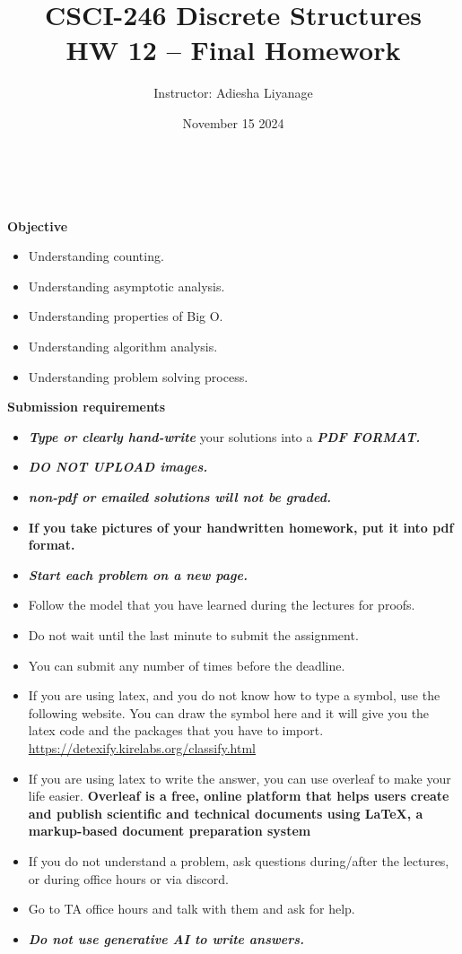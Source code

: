 \documentclass[12pt]{exam}
\title{CSCI-246 Discrete Structures \\ HW 12 -- Final Homework}
\author{Instructor: Adiesha Liyanage}
\date{November 15 2024}
\begin{document}
\maketitle

\hrulefill
\\
\\
\textbf{Objective}
\begin{itemize}
    \item Understanding counting.
    \item Understanding asymptotic analysis.
    \item Understanding properties of Big O.
    \item Understanding algorithm analysis.
    \item Understanding problem solving process. 
\end{itemize}

\textbf{Submission requirements}
\begin{itemize}
    \item \textbf{\textit{Type or clearly hand-write}} your solutions into a \textbf{\textit{PDF FORMAT.}} 
    \item \textbf{\textit{DO NOT UPLOAD images.}}
    \item \textbf{\textit{non-pdf or emailed solutions will not be graded.}}
    \item \textbf{If you take pictures of your handwritten homework, put it into pdf format.}
    \item \textbf{\textit{Start each problem on a new page.}}
    \item Follow the model that you have learned during the lectures for proofs.
    \item Do not wait until the last minute to submit the assignment.
    \item You can submit any number of times before the deadline. 
    \item If you are using latex, and you do not know how to type a symbol, use the following website. You can draw the symbol here and it will give you the latex code and the packages that you have to import. \url{https://detexify.kirelabs.org/classify.html}
    \item If you are using latex to write the answer, you can use overleaf to make your life easier. \textbf{Overleaf is a free, online platform that helps users create and publish scientific and technical documents using LaTeX, a markup-based document preparation system}
    \item If you do not understand a problem, ask questions during/after the lectures, or during office hours or via discord.
    \item Go to TA office hours and talk with them and ask for help.
    \item \textbf{\textit{Do not use generative AI to write answers.}} 
\end{itemize}
\end{document}
